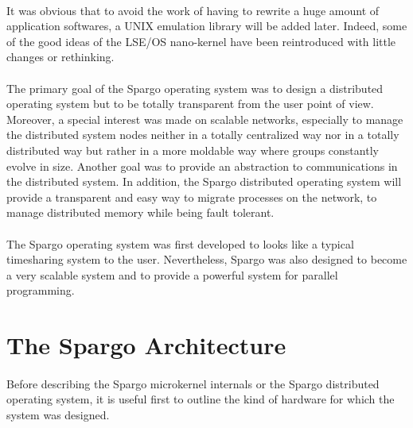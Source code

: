 \documentclass[10pt,a4wide]{article}
\begin{document}
\begin{multicols}{2}
\paragraph{}

It was obvious that to avoid the work of having to rewrite a huge amount
of application softwares, a UNIX emulation library will be added later.
Indeed, some of the good ideas of the LSE/OS nano-kernel have been
reintroduced with little changes or rethinking.

\paragraph{}

The primary goal of the Spargo operating system was to design a distributed
operating system but to be totally transparent from the user point of view.
Moreover, a special interest was made on scalable networks, especially
to manage the distributed system nodes neither in a totally centralized way
nor in a totally distributed way but rather in a more moldable way where groups
constantly evolve in size. Another goal was to provide an abstraction to
communications in the distributed system. In addition, the Spargo distributed
operating system will provide a transparent and easy way to migrate processes
on the network, to manage distributed memory while being fault tolerant.

\paragraph{}

The Spargo operating system was first developed to looks like a typical
timesharing system to the user. Nevertheless, Spargo was also designed to
become a very scalable system and to provide a powerful system for
parallel programming.



\section{The Spargo Architecture}

\paragraph{}

Before describing the Spargo microkernel internals or the Spargo distributed
operating system, it is useful first to outline the kind of hardware for
which the system was designed.


\end{multicols}
\end{document}
